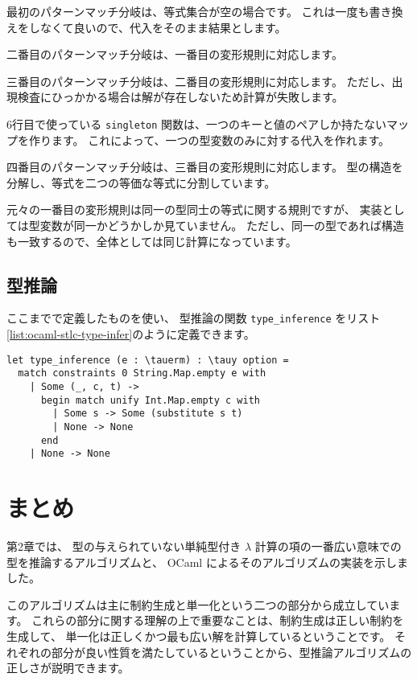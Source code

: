 最初のパターンマッチ分岐は、等式集合が空の場合です。
これは一度も書き換えをしなくて良いので、代入をそのまま結果とします。

二番目のパターンマッチ分岐は、一番目の変形規則に対応します。

三番目のパターンマッチ分岐は、二番目の変形規則に対応します。
ただし、出現検査にひっかかる場合は解が存在しないため計算が失敗します。

6行目で使っている \texttt{singleton} 関数は、一つのキーと値のペアしか持たないマップを作ります。
これによって、一つの型変数のみに対する代入を作れます。

四番目のパターンマッチ分岐は、三番目の変形規則に対応します。
型の構造を分解し、等式を二つの等価な等式に分割しています。

元々の一番目の変形規則は同一の型同士の等式に関する規則ですが、
実装としては型変数が同一かどうかしか見ていません。
ただし、同一の型であれば構造も一致するので、全体としては同じ計算になっています。

\subsection{型推論}

ここまでで定義したものを使い、
型推論の関数 \texttt{type\_inference} をリスト\ref{list:ocaml-stlc-type-infer}のように定義できます。

\begin{lstlisting}[caption=型推論, label=list:ocaml-stlc-type-infer]
let type_inference (e : \tauerm) : \tauy option =
  match constraints 0 String.Map.empty e with
    | Some (_, c, t) ->
      begin match unify Int.Map.empty c with
        | Some s -> Some (substitute s t)
        | None -> None
      end
    | None -> None
\end{lstlisting}

\section{まとめ}

第2章では、
型の与えられていない単純型付き $\lambda$ 計算の項の一番広い意味での型を推論するアルゴリズムと、
OCaml によるそのアルゴリズムの実装を示しました。

このアルゴリズムは主に制約生成と単一化という二つの部分から成立しています。
これらの部分に関する理解の上で重要なことは、制約生成は正しい制約を生成して、
単一化は正しくかつ最も広い解を計算しているということです。
それぞれの部分が良い性質を満たしているということから、型推論アルゴリズムの正しさが説明できます。

